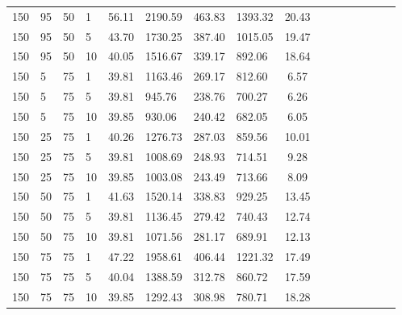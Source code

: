 \begin{center}
\begin{table}[h]
\begin{tabular}{clclclclclclclc|c}
150 & 95 & 50 & 1 & \cellcolor{gray!1}56.11 & \cellcolor{gray!1}2190.59 & \cellcolor{gray!1}463.83 & \cellcolor{gray!1}1393.32 & 20.43\\
150 & 95 & 50 & 5 & \cellcolor{gray!11}43.70 & \cellcolor{gray!1}1730.25 & \cellcolor{gray!1}387.40 & \cellcolor{gray!1}1015.05 & 19.47\\
150 & 95 & 50 & 10 & \cellcolor{gray!48}40.05 & \cellcolor{gray!1}1516.67 & \cellcolor{gray!1}339.17 & \cellcolor{gray!1}892.06 & 18.64\\
150 & 5 & 75 & 1 & \cellcolor{gray!50}39.81 & \cellcolor{gray!7}1163.46 & \cellcolor{gray!13}269.17 & \cellcolor{gray!8}812.60 & 6.57\\
150 & 5 & 75 & 5 & \cellcolor{gray!50}39.81 & \cellcolor{gray!48}945.76 & \cellcolor{gray!48}238.76 & \cellcolor{gray!43}700.27 & 6.26\\
150 & 5 & 75 & 10 & \cellcolor{gray!50}39.85 & \cellcolor{gray!50}930.06 & \cellcolor{gray!46}240.42 & \cellcolor{gray!49}682.05 & 6.05\\
150 & 25 & 75 & 1 & \cellcolor{gray!46}40.26 & \cellcolor{gray!1}1276.73 & \cellcolor{gray!1}287.03 & \cellcolor{gray!1}859.56 & 10.01\\
150 & 25 & 75 & 5 & \cellcolor{gray!50}39.81 & \cellcolor{gray!36}1008.69 & \cellcolor{gray!36}248.93 & \cellcolor{gray!39}714.51 & 9.28\\
150 & 25 & 75 & 10 & \cellcolor{gray!50}39.85 & \cellcolor{gray!37}1003.08 & \cellcolor{gray!42}243.49 & \cellcolor{gray!39}713.66 & 8.09\\
150 & 50 & 75 & 1 & \cellcolor{gray!32}41.63 & \cellcolor{gray!1}1520.14 & \cellcolor{gray!1}338.83 & \cellcolor{gray!1}929.25 & 13.45\\
150 & 50 & 75 & 5 & \cellcolor{gray!50}39.81 & \cellcolor{gray!12}1136.45 & \cellcolor{gray!1}279.42 & \cellcolor{gray!31}740.43 & 12.74\\
150 & 50 & 75 & 10 & \cellcolor{gray!50}39.81 & \cellcolor{gray!24}1071.56 & \cellcolor{gray!1}281.17 & \cellcolor{gray!47}689.91 & 12.13\\
150 & 75 & 75 & 1 & \cellcolor{gray!1}47.22 & \cellcolor{gray!1}1958.61 & \cellcolor{gray!1}406.44 & \cellcolor{gray!1}1221.32 & 17.49\\
150 & 75 & 75 & 5 & \cellcolor{gray!48}40.04 & \cellcolor{gray!1}1388.59 & \cellcolor{gray!1}312.78 & \cellcolor{gray!1}860.72 & 17.59\\
150 & 75 & 75 & 10 & \cellcolor{gray!50}39.85 & \cellcolor{gray!1}1292.43 & \cellcolor{gray!1}308.98 & \cellcolor{gray!18}780.71 & 18.28\\

\end{tabular}
\end{table}
\end{center}
